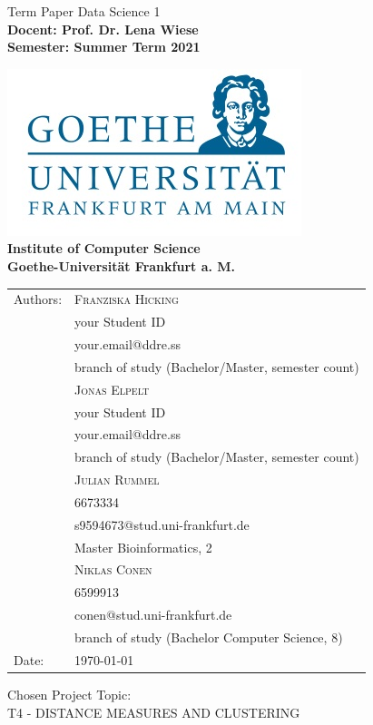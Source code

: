 \documentclass[12pt]%
{article}
\begin{document}
\begin{titlepage}

\begin{center}

{\Huge {
Term Paper Data Science 1}
}
\\[2ex]

\textbf{
\Large 
Docent: Prof. Dr. Lena Wiese \\ 
Semester: Summer Term 2021\\  
}



\includegraphics[scale=0.4]{logo.jpg} \\ 
\large{\textbf{Institute of Computer Science \\ Goethe-Universit\"at Frankfurt a. M.}}



\begin{tabular}{ll}
Authors: & \textsc{Franziska Hicking} \\
& {\small your Student ID} \\
& {\small your.email@ddre.ss} \\
& {\small branch of study (Bachelor/Master, semester count)} \\
& \textsc{Jonas Elpelt} \\
& {\small your Student ID}\\
&{\small  your.email@ddre.ss}\\
& {\small branch of study (Bachelor/Master, semester count)} \\
& \textsc{Julian Rummel} \\
&{\small  6673334}\\
& {\small s9594673@stud.uni-frankfurt.de}\\
&{\small  Master Bioinformatics, 2} \\
& \textsc{Niklas Conen}\\
& {\small 6599913}\\
& {\small conen@stud.uni-frankfurt.de}\\
& {\small branch of study (Bachelor Computer Science, 8)}\\
Date: & \today \\		
\end{tabular}

\end{center}

\vspace*{\fill}

\large
\noindent{}Chosen Project Topic: \\
T4 - DISTANCE MEASURES AND CLUSTERING


\end{titlepage}
\end{document}
